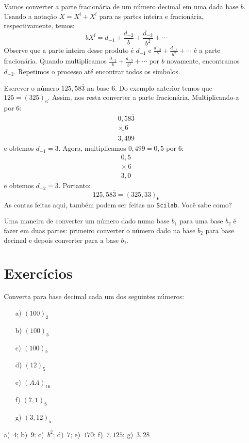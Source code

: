 \documentclass[main.tex]{subfiles}
\begin{document}
Vamos converter a parte fracionária de um número decimal em uma dada base $b$. Usando a notação $X = X^{\mbox{i}} + X^{\mbox{f}}$ para as partes inteira e fracionária, respectivamente, temos:
\begin{equation*}
  bX^{\mbox{f}}=d_{-1}+\frac{d_{-2}}{b}+\frac{d_{-3}}{b^2}+\cdots  
\end{equation*}
Observe que a parte inteira desse produto é $d_{-1}$ e $\frac{d_{-2}}{b}+\frac{d_{-3}}{b^2}+\cdots$ é a parte fracionária. Quando multiplicamos $\frac{d_{-2}}{b}+\frac{d_{-3}}{b^2}+\cdots$ por $b$ novamente, encontramos $d_{-2}$. Repetimos o processo até encontrar todos os símbolos.

\begin{ex} Escrever o número $125,58\overline{3}$ na base $6$. Do exemplo anterior temos que $125=(325)_6$. Assim, nos resta converter a parte fracionária, Multiplicando-a por $6$:
$$
\begin{array}{l}
0,58\overline{3}\\
\underline{\times\ 6}\\
3,49 \overline{9}
\end{array}
$$
e obtemos $d_{-1}=3$. Agora, multiplicamos $0,49\overline{9}=0,5$ por $6$:
$$
\begin{array}{l}
0,5\\
\underline{\times\ 6}\\
3,0
\end{array}
$$
e obtemos $d_{-2}=3$. Portanto:
$$
125,58\overline{3}=(325,33)_6
$$
\ifisscilab
As contas feitas aqui, também podem ser feitas no \verb+Scilab+. Você sabe como?
\fi
\end{ex}

Uma maneira de converter um número dado numa base $b_1$ para uma base $b_2$ é fazer em duas partes: primeiro converter o número dado na base $b_2$ para base decimal e depois converter para a base $b_1$.

\section*{Exercícios}

\indent 
\begin{Exercise} Converta para base decimal cada um dos seguintes números:
  \begin{multicols}{4}
    \begin{itemize}
    \item[a)]  $(100)_2$
    \item[b)]  $(100)_3$
    \item[c)]  $(100)_b$
    \item[d)]  $(12)_5$
    \item[e)]  $(AA)_{16}$
    \item[f)]  $(7,1)_8$
    \item[g)]  $(3,12)_5$
    \end{itemize}    
  \end{multicols}
\end{Exercise}
\begin{Answer}
  a)~$4$; b)~$9$; c)~$b^2$; d)~$7$; e)~$170$; f)~$7,125$; g)~$3,28$
\end{Answer}
\end{document}

